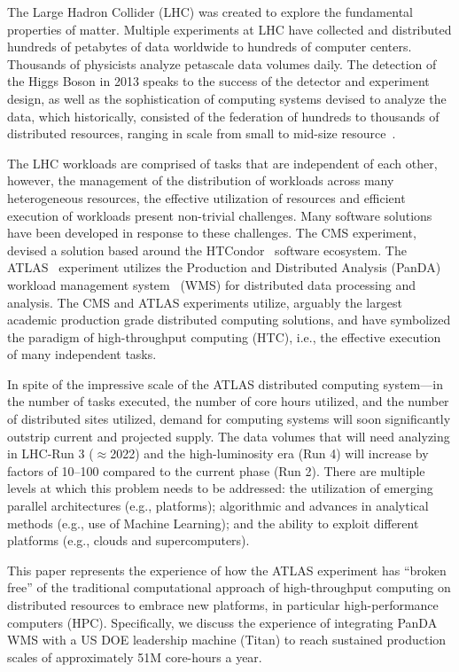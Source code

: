 The Large Hadron Collider (LHC) was created to explore the fundamental
properties of matter. Multiple experiments at LHC have collected and
distributed hundreds of petabytes of data worldwide to hundreds of computer
centers. Thousands of physicists analyze petascale data volumes daily. The
detection of the Higgs Boson in 2013 speaks to the success of the detector
and experiment design, as well as the sophistication of computing systems
devised to analyze the data, which historically, consisted of the federation
of hundreds to thousands of distributed resources, ranging in scale from
small to mid-size resource~\cite{foster2003grid}.

The LHC workloads are comprised of tasks that are independent of each other,
however, the management of the distribution of workloads across many
heterogeneous resources, the effective utilization of resources and efficient
execution of workloads present non-trivial challenges. Many software
solutions have been developed in response to these challenges. The CMS
experiment, devised a solution based around the
HTCondor~\cite{thain2005distributed} software ecosystem. The
ATLAS~\cite{Aad:2008} experiment utilizes the Production and Distributed
Analysis (PanDA) workload management system~\cite{Maeno2011} (WMS) for
distributed data processing and analysis. The CMS and ATLAS experiments
utilize, arguably the largest academic production grade distributed computing
solutions, and have symbolized the paradigm of high-throughput computing
(HTC), i.e., the effective execution of many independent tasks.

In spite of the impressive scale of the ATLAS distributed computing
system---in the number of tasks executed, the number of core hours utilized,
and the number of distributed sites utilized,  demand for computing systems
will soon significantly outstrip current and projected supply.   The data
volumes that will need analyzing in LHC-Run 3 (\(\approx\)2022) and the
high-luminosity era (Run 4) will increase by factors of 10--100 compared to
the current phase (Run 2). There are multiple levels at which this problem
needs to be addressed: the utilization of emerging parallel architectures
(e.g., platforms); algorithmic and advances in analytical methods (e.g., use
of Machine Learning); and the ability to exploit different platforms (e.g.,
clouds and supercomputers).

This paper represents the experience of how the ATLAS experiment has ``broken
free'' of the traditional computational approach of high-throughput computing
on distributed resources to embrace new platforms, in particular
high-performance computers (HPC). Specifically, we discuss the experience of
integrating PanDA WMS with a US DOE leadership machine (Titan) to reach
sustained production scales of approximately 51M core-hours a year.

